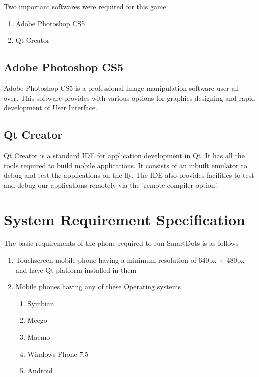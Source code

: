 \documentclass[a4paper,12pt]{article}
\begin{document}
Two important softwares were required for this game
\begin{enumerate}
 \item Adobe Photoshop CS5
 \item Qt Creator
\end{enumerate}

\subsection{Adobe Photoshop CS5}
\hspace{18pt}Adobe Photoshop CS5 is a professional image manipulation software user all over. This software provides with various options for graphics designing and rapid development of User Interface.

\subsection{Qt Creator}
\hspace{18pt}Qt Creator is a standard IDE for application development in Qt. It has all the tools required to build mobile applications. It consists of an inbuilt emulator to debug and test the applications on the fly. The IDE also provides facilities to test and debug our applications remotely via the 'remote compiler option'.

\newpage                                                                  	
\section{System Requirement Specification}
\hspace{18pt}The basic requirements of the phone required to run SmartDots is as follows
\begin{enumerate}
 \item Touchscreen mobile phone having a minimum resolution of 640px $\times$ 480px and have Qt platform installed in them
 \item Mobile phones having any of these Operating systems
        \begin{enumerate}
	\item Symbian
        \item Meego
        \item Maemo
        \item Windows Phone 7.5
        \item Android        
	\end{enumerate}
 
\end{enumerate}
\end{document}
